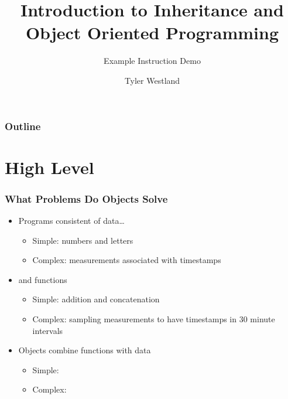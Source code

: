 \documentclass{beamer}
\title[Intro to Inheritance \& OOP]{Introduction to Inheritance and Object Oriented Programming}
\subtitle{Example Instruction Demo}
\author{Tyler Westland}
\date{}
\begin{document}
 
\begin{frame}
\titlepage
\end{frame}

\begin{frame}
\frametitle{Outline}
\tableofcontents
\end{frame}


%

\section{High Level}
  \begin{frame}
    \frametitle{What Problems Do Objects Solve}
    \begin{itemize}
      \item<1-> Programs consistent of data\ldots
        \begin{itemize}
          \item Simple: numbers and letters
          \item Complex: measurements associated with timestamps
        \end{itemize}
      \item<2-> and functions
        \begin{itemize}
          \item Simple: addition and concatenation
          \item Complex: sampling measurements to have timestamps in 30 minute intervals
        \end{itemize}
      \item<3-> Objects combine functions with data
        \begin{itemize}
          \item Simple:
          \item Complex: 
        \end{itemize}
    \end{itemize}
  \end{frame}
\end{document}
